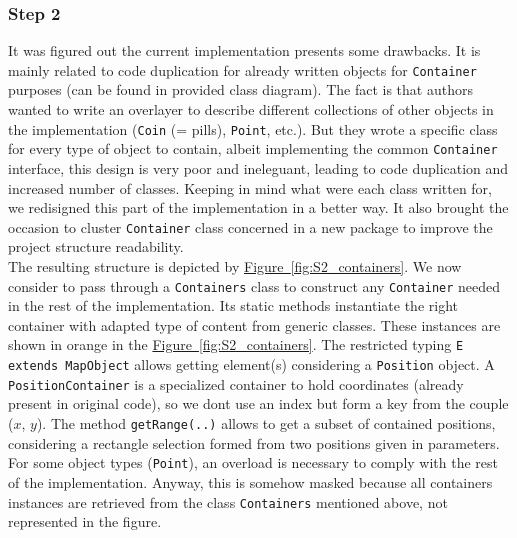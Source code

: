 \documentclass[]{article}
\newcommand{\wordlink}[2]{\hyperref[#2]{#1~\ref{#2}}}
\begin{document}
\subsubsection{Step 2}

\indent\par It was figured out the current implementation presents some drawbacks. It is mainly related to code duplication for already written objects for \texttt{Container} purposes (can be found in provided class diagram). The fact is that authors wanted to write an overlayer to describe different collections of other objects in the implementation (\texttt{Coin} (= pills), \texttt{Point}, etc.). But they wrote a specific class for every type of object to contain, albeit implementing the common \texttt{Container} interface, this design is very poor and ineleguant, leading to code duplication and increased number of classes. Keeping in mind what were each class written for, we redisigned this part of the implementation in a better way. It also brought the occasion to cluster \texttt{Container} class concerned in a new package to improve the project structure readability.\\

The resulting structure is depicted by \wordlink{Figure}{fig:S2_containers}. We now consider to pass through a \texttt{Containers} class to construct any \texttt{Container} needed in the rest of the implementation. Its static methods instantiate the right container with adapted type of content from generic classes. These instances are shown in orange in the \wordlink{Figure}{fig:S2_containers}. The restricted typing \texttt{E extends MapObject} allows getting element(s) considering a \texttt{Position} object. A \texttt{PositionContainer} is a specialized container to hold coordinates (already present in original code), so we dont use an index but form a key from the couple ($x$, $y$). The method \texttt{getRange(..)} allows to get a subset of contained positions, considering a rectangle selection formed from two positions given in parameters. For some object types (\texttt{Point}), an overload is necessary to comply with the rest of the implementation. Anyway, this is somehow masked because all containers instances are retrieved from the class \texttt{Containers} mentioned above,  not represented in the figure.

\newpage
\end{document}

